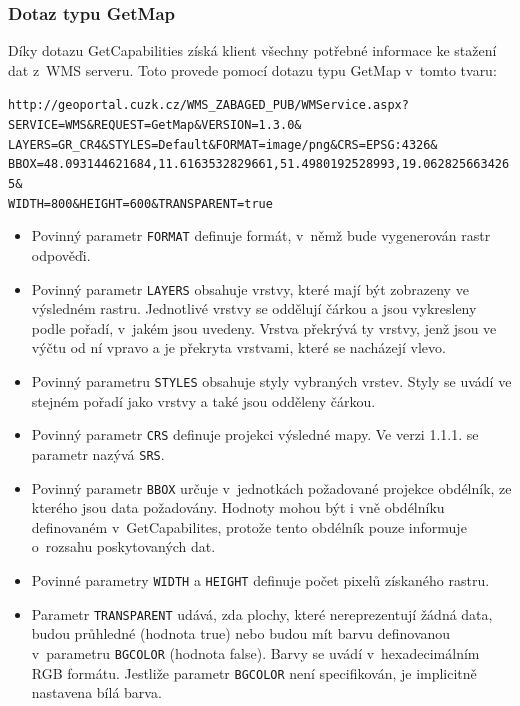 \documentclass[a4paper,12pt]{article}
\begin{document}
\subsubsection{Dotaz typu GetMap}

Díky dotazu GetCapabilities získá klient všechny potřebné informace ke
stažení dat z~WMS serveru.  Toto provede pomocí dotazu typu GetMap
v~tomto tvaru:

\begin{alltt}\footnotesize
http://geoportal.cuzk.cz/WMS\_ZABAGED\_PUB/WMService.aspx?
SERVICE=WMS\&REQUEST=GetMap\&VERSION=1.3.0\&
LAYERS=GR\_CR4\&STYLES=Default\&FORMAT=image/png\&CRS=EPSG:4326\&
BBOX=48.093144621684,11.6163532829661,51.4980192528993,19.0628256634265\&
WIDTH=800\&HEIGHT=600\&TRANSPARENT=true
\end{alltt}


\begin{itemize}
  \item Povinný parametr {\tt FORMAT} definuje formát, v~němž bude vygenerován 
  rastr odpověďi. 
  \item Povinný parametr {\tt LAYERS} obsahuje vrstvy, které mají být zobrazeny ve
    výsledném rastru. Jednotlivé vrstvy se oddělují čárkou a jsou
    vykresleny podle pořadí, v~jakém jsou uvedeny. Vrstva překrývá ty
    vrstvy, jenž jsou ve výčtu od ní vpravo a je překryta vrstvami,
    které se nacházejí vlevo.
  \item Povinný parametru {\tt STYLES} obsahuje styly vybraných vrstev. Styly se
    uvádí ve stejném pořadí jako vrstvy a také jsou odděleny čárkou.
  \item Povinný parametr {\tt CRS} definuje projekci výsledné mapy. 
  Ve verzi 1.1.1. se parametr nazývá  {\tt SRS}.
  \item Povinný parametr {\tt BBOX} určuje v~jednotkách požadované projekce
    obdélník, ze kterého jsou data požadovány. Hodnoty mohou být i vně
    obdélníku definovaném v~GetCapabilites, protože tento obdélník pouze      
    informuje o~rozsahu poskytovaných dat.
  \item Povinné parametry {\tt WIDTH} a {\tt HEIGHT} definuje počet pixelů získaného
    rastru.
  \item Parametr {\tt TRANSPARENT} udává, zda plochy, které nereprezentují
        žádná data, budou průhledné (hodnota true) nebo budou mít barvu definovanou
        v~parametru {\tt BGCOLOR} (hodnota false). Barvy se uvádí v~hexadecimálním RGB formátu.
        Jestliže parametr {\tt BGCOLOR} není specifikován, je implicitně nastavena 
        bílá barva.
\end{itemize}
\end{document}
